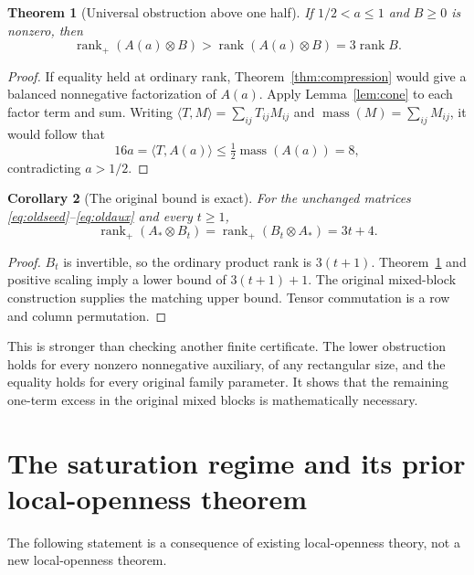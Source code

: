 \documentclass[11pt]{article}
\newtheorem{theorem}{Theorem}[section]
\newtheorem{corollary}[theorem]{Corollary}
\theoremstyle{definition}\newtheorem{definition}[theorem]{Definition}
\theoremstyle{remark}\newtheorem{remark}[theorem]{Remark}
\newcommand{\rk}{\operatorname{rank}}
\newcommand{\rp}{\operatorname{rank}_{+}}
\begin{document}
\begin{theorem}[Universal obstruction above one half]\label{thm:half}
If $1/2<a\le1$ and $B\ge0$ is nonzero, then
\begin{equation}\label{eq:half}
\rp(A(a)\otimes B)>\rk(A(a)\otimes B)=3\rk B.
\end{equation}
\end{theorem}
\begin{proof}
If equality held at ordinary rank, Theorem~\ref{thm:compression} would give a balanced nonnegative factorization of $A(a)$. Apply Lemma~\ref{lem:cone} to each factor term and sum. Writing $\langle T,M\rangle=\sum_{ij}T_{ij}M_{ij}$ and $\operatorname{mass}(M)=\sum_{ij}M_{ij}$, it would follow that
\[
16a=\langle T,A(a)\rangle\le\tfrac12\operatorname{mass}(A(a))=8,
\]
contradicting $a>1/2$.
\end{proof}

\begin{corollary}[The original bound is exact]\label{cor:original}
For the unchanged matrices \eqref{eq:oldseed}--\eqref{eq:oldaux} and every $t\ge1$,
\begin{equation}\label{eq:oldexact}
\boxed{\quad\rp(A_*\otimes B_t)=\rp(B_t\otimes A_*)=3t+4.\quad}
\end{equation}
\end{corollary}
\begin{proof}
$B_t$ is invertible, so the ordinary product rank is $3(t+1)$. Theorem~\ref{thm:half} and positive scaling imply a lower bound of $3(t+1)+1$. The original mixed-block construction supplies the matching upper bound. Tensor commutation is a row and column permutation.
\end{proof}

This is stronger than checking another finite certificate. The lower obstruction holds for every nonzero nonnegative auxiliary, of any rectangular size, and the equality holds for every original family parameter. It shows that the remaining one-term excess in the original mixed blocks is mathematically necessary.

\section{The saturation regime and its prior local-openness theorem}\label{sec:saturation}

The following statement is a consequence of existing local-openness theory, not a new local-openness theorem.
\end{document}
